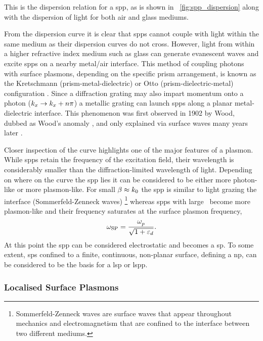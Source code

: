 \documentclass{article}
\begin{document}
This is the dispersion relation for a \gls{spp}, as is shown in \figurename~\ref{fig:spp_dispersion} along with the dispersion of light for both air and glass mediums.

From the dispersion curve it is clear that \glspl{spp} cannot couple with light within the same medium as their dispersion curves do not cross. However, light from within a higher refractive index medium such as glass can generate evanescent waves and excite \glspl{spp} on a nearby metal/air interface. This method of coupling photons with surface plasmons, depending on the specific prism arrangement, is known as the Kretschmann (prism-metal-dielectric) or Otto (prism-dielectric-metal) configuration \cite{otto1968, kretschmann1971}. Since a diffraction grating may also impart momentum onto a photon ($k_x \rightarrow k_x + n\pi$) a metallic grating can launch \glspl{spp} along a planar metal-dielectric interface. This phenomenon was first observed in 1902 by Wood, dubbed as Wood's anomaly \cite{wood1902}, and only explained via surface waves many years later \cite{fano1941}.

Closer inspection of the curve highlights one of the major features of a plasmon. While \glspl{spp} retain the frequency of the excitation field, their wavelength is considerably smaller than the diffraction-limited wavelength of light.
Depending on where on the curve the \gls{spp} lies it can be considered to be either more photon-like or more plasmon-like. For small $\beta\approx k_0$ the \gls{spp} is similar to light grazing the interface (Sommerfeld-Zenneck waves)%
\footnote{Sommerfeld-Zenneck waves are surface waves that appear throughout mechanics and electromagnetism that are confined to the interface between two different mediums.}
whereas \glspl{spp} with large \wvm\ become more plasmon-like and their frequency saturates at the surface plasmon frequency,
\begin{equation}
	\omega_{\mathrm{SP}} = \frac{\omega_{p}^{}}{\sqrt{1+\varepsilon_d}}.
\end{equation}
At this point the \gls{spp} can be considered electrostatic and becomes a \gls{sp}. To some extent, \glspl{sp} confined to a finite, continuous, non-planar surface, defining a \gls{np}, can be considered to be the basis for a \gls{lsp} {\color{red}or \gls{lspp}}.

\subsubsection{Localised Surface Plasmons}
\end{document}
